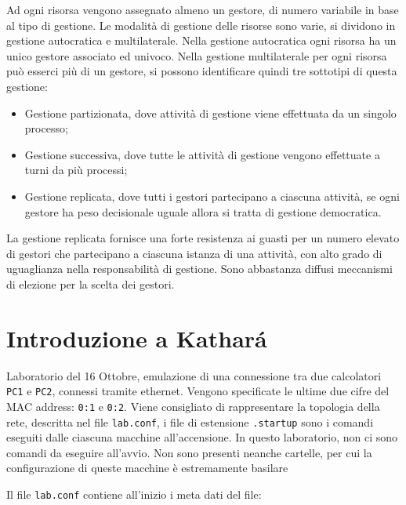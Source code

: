 \documentclass{article}
\numberwithin{equation}{subsection}
\begin{document}
Ad ogni risorsa vengono assegnato almeno un gestore, di numero variabile in base al tipo di gestione. 
Le modalità di gestione delle risorse sono varie, si dividono in gestione autocratica e multilaterale. Nella gestione autocratica ogni risorsa ha un unico gestore 
associato ed univoco. Nella gestione multilaterale per ogni risorsa può esserci più di un gestore, si possono identificare quindi tre sottotipi di questa gestione:
\begin{itemize}
  \item Gestione partizionata, dove attività di gestione viene effettuata da un singolo processo;
  \item Gestione successiva, dove tutte le attività di gestione vengono effettuate a turni da più processi;
  \item Gestione replicata, dove tutti i gestori partecipano a ciascuna attività, se ogni gestore ha peso decisionale uguale allora si tratta di gestione democratica. 
\end{itemize}

La gestione replicata fornisce una forte resistenza ai guasti per un numero elevato di gestori che partecipano a ciascuna istanza di una attività, con alto grado di 
uguaglianza nella responsabilità di gestione. Sono abbastanza diffusi meccanismi di elezione per la scelta dei gestori. 

\clearpage

\section{Introduzione a Kathar\'{a}}


Laboratorio del 16 Ottobre, emulazione di una connessione tra due calcolatori \verb|PC1| e \verb|PC2|, connessi tramite ethernet. Vengono 
specificate le ultime due cifre del MAC address: \verb|0:1| e \verb|0:2|. 
Viene consigliato di rappresentare la topologia della rete, descritta nel file \verb|lab.conf|, i file di estensione \verb|.startup| sono i 
comandi eseguiti dalle ciascuna macchine all'accensione. In questo laboratorio, non ci sono comandi da eseguire all'avvio. Non sono presenti 
neanche cartelle, per cui la configurazione di queste macchine è estremamente basilare



Il file \verb|lab.conf| contiene all'inizio i meta dati del file:
\end{document}
